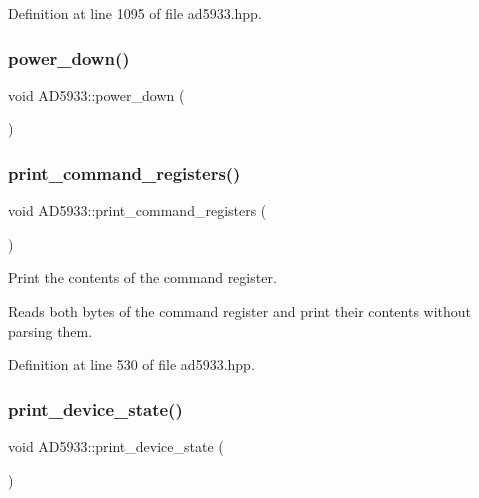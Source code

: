 Definition at line 1095 of file ad5933.\+hpp.

\mbox{\label{struct_a_d5933_afa4853c8fab1437072b6c8d860a99e2d}} 
\subsubsection{\texorpdfstring{power\+\_\+down()}{power\_down()}}
{\footnotesize\ttfamily void A\+D5933\+::power\+\_\+down (\begin{DoxyParamCaption}{ }\end{DoxyParamCaption})}

\mbox{\label{struct_a_d5933_a789fe15e33f626caf0cfc3e068062c26}} 
\subsubsection{\texorpdfstring{print\+\_\+command\+\_\+registers()}{print\_command\_registers()}}
{\footnotesize\ttfamily void A\+D5933\+::print\+\_\+command\+\_\+registers (\begin{DoxyParamCaption}{ }\end{DoxyParamCaption})}



Print the contents of the command register. 

Reads both bytes of the command register and print their contents without parsing them. 

Definition at line 530 of file ad5933.\+hpp.

\mbox{\label{struct_a_d5933_ac180b673bdde8afa6d368a70886ecf8a}} 
\subsubsection{\texorpdfstring{print\+\_\+device\+\_\+state()}{print\_device\_state()}}
{\footnotesize\ttfamily void A\+D5933\+::print\+\_\+device\+\_\+state (\begin{DoxyParamCaption}{ }\end{DoxyParamCaption})}



